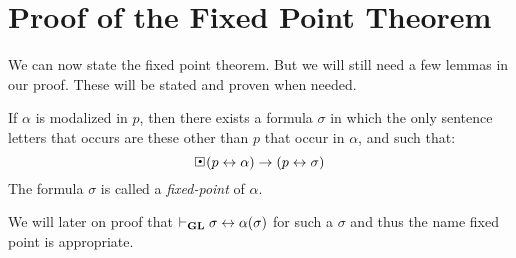 \documentclass[../main.tex]{subfiles}
\begin{document}
\section{Proof of the Fixed Point Theorem}

We can now state the fixed point theorem. But we will still need a few lemmas
in our proof. These will be stated and proven when needed.

\begin{thm}
	\label{thm:Fixed}
	If $\alpha$ is modalized in $p$, then there exists a formula $\sigma$
	in which the only sentence letters that occurs are these other than $p$
	that occur in $\alpha$, and such that:
	\[\sBox(p\leftrightarrow\alpha)\rightarrow(p\leftrightarrow\sigma)\]
	The formula $\sigma$ is called a \textit{fixed-point} of $\alpha$.
\end{thm}
We will later on proof that $\vdash_{\text{\textbf{GL}}}\sigma\leftrightarrow\alpha(\sigma)$ for
such a $\sigma$ and thus the name fixed point is appropriate.
\end{document}
